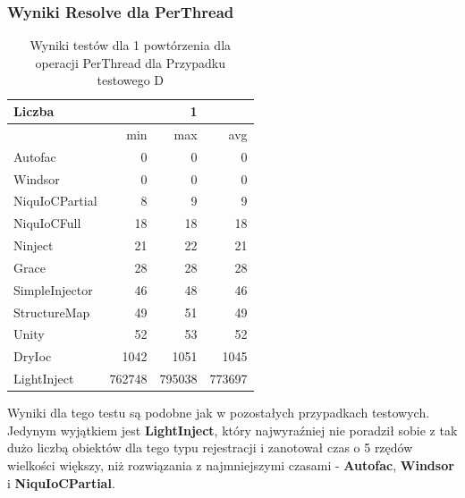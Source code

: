 \documentclass[12pt]{article}
\begin{document}
\subsubsection{Wyniki Resolve dla PerThread}
\begin{table}[H]
\captionsetup{belowskip=0pt,aboveskip=0pt}
\begin{center}
\begin{small}
	\begin{tabular}{ | l | r r r | }
    		\hline
Liczba & & 1 & \\ \hline
 & min & max & avg \\ \hline
Autofac & 0 & 0 & 0 \\ \hline
Windsor & 0 & 0 & 0 \\ \hline
NiquIoCPartial & 8 & 9 & 9 \\ \hline
NiquIoCFull & 18 & 18 & 18 \\ \hline
Ninject & 21 & 22 & 21 \\ \hline
Grace & 28 & 28 & 28 \\ \hline
SimpleInjector & 46 & 48 & 46 \\ \hline
StructureMap & 49 & 51 & 49 \\ \hline
Unity & 52 & 53 & 52 \\ \hline
DryIoc & 1042 & 1051 & 1045 \\ \hline
LightInject & 762748 & 795038 & 773697 \\ \hline
  	\end{tabular}
\end{small}
\end{center}
\caption{Wyniki testów dla 1 powtórzenia dla operacji PerThread dla Przypadku testowego D}
\label{TestCaseD_PerThread1}
\end{table}
Wyniki dla tego testu są podobne jak w pozostałych przypadkach testowych. Jedynym wyjątkiem jest \textbf{LightInject}, który najwyraźniej nie poradził sobie z tak dużo liczbą obiektów dla tego typu rejestracji i zanotował czas o 5 rzędów wielkości większy, niż rozwiązania z najmniejszymi czasami - \textbf{Autofac}, \textbf{Windsor} i \textbf{NiquIoCPartial}.
\\ \\
\end{document}
